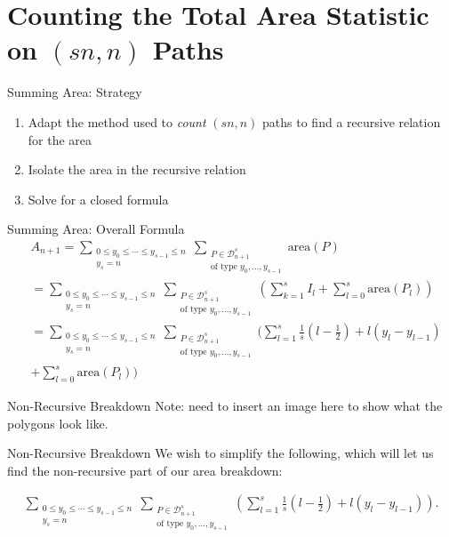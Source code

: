 \documentclass{beamer}
\begin{document}
\section{Counting the Total Area Statistic on $(sn,n)$ Paths}
\begin{frame}{Summing Area: Strategy}
    \begin{enumerate}
        \item Adapt the method used to \textit{count} $(sn,n)$ paths to find a recursive relation for the area
        \item Isolate the area in the recursive relation
        \item Solve for a closed formula
    \end{enumerate}
\end{frame}

\begin{frame}{Summing Area: Overall Formula}
    \begin{align*}
    & A_{n+1} = \sum_{\substack{0\leq y_{0}\leq \cdots\leq y_{s-1}\leq n\\y_{s}=n}} \sum_{\substack{P\in \mathcal{D}_{n+1}^{s}\\\text{of type }y_{0},\ldots, y_{s-1}}} \text{area}(P) \\
    &= \sum_{\substack{0\leq y_{0}\leq \cdots\leq y_{s-1}\leq n\\y_{s}=n}} \sum_{\substack{P\in \mathcal{D}_{n+1}^{s}\\\text{of type }y_{0},\ldots, y_{s-1}}} \left( \sum_{k=1}^{s}I_{l} + \sum_{l=0}^{s}\text{area}(P_{l}) \right) \\
    &= \sum_{\substack{0\leq y_{0}\leq \cdots\leq y_{s-1}\leq n\\y_{s}=n}} \sum_{\substack{P\in \mathcal{D}_{n+1}^{s}\\\text{of type }y_{0},\ldots, y_{s-1}}} \bigg( \sum_{l=1}^{s}\frac{1}{s}(l-\frac{1}{2}) +l(y_{l}-y_{l-1}) \\ & + \sum_{l=0}^{s}\text{area}(P_{l}) \bigg)
\end{align*}
\end{frame}

\begin{frame}{Non-Recursive Breakdown}
Note: need to insert an image here to show what the polygons look like.
\end{frame}

\begin{frame}{Non-Recursive Breakdown}
We wish to simplify the following, which will let us find the non-recursive part of our area breakdown:

\begin{align*}
  \sum_{\substack{0\leq y_{0}\leq \cdots\leq y_{s-1}\leq n\\y_{s}=n}} \sum_{\substack{P\in \mathcal{D}_{n+1}^{s}\\ \text{of type }y_{0},\ldots, y_{s-1}}} \left( \sum_{l=1}^{s}\frac{1}{s}(l-\frac{1}{2}) +l(y_{l}-y_{l-1}) \right).
\end{align*}

\end{frame}
\end{document}
